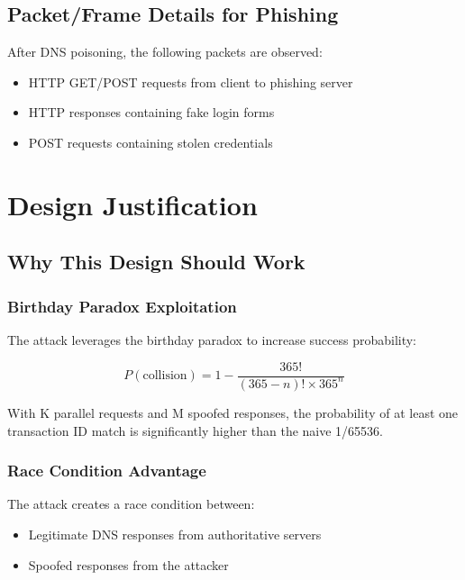 \documentclass[12pt,a4paper]{article}
\begin{document}
\subsection{Packet/Frame Details for Phishing}

After DNS poisoning, the following packets are observed:
\begin{itemize}
    \item HTTP GET/POST requests from client to phishing server
    \item HTTP responses containing fake login forms
    \item POST requests containing stolen credentials
\end{itemize}

\section{Design Justification}

\subsection{Why This Design Should Work}

\subsubsection{ Birthday Paradox Exploitation}

The attack leverages the birthday paradox \cite{feng-dns} to increase success probability:

\begin{equation}
P(\text{collision}) = 1 - \frac{365!}{(365-n)! \times 365^n}
\end{equation}

With K parallel requests and M spoofed responses, the probability of at least one transaction ID match is significantly higher than the naive 1/65536.

\subsubsection{ Race Condition Advantage}

The attack creates a race condition between:
\begin{itemize}
    \item Legitimate DNS responses from authoritative servers
    \item Spoofed responses from the attacker
\end{itemize}
\end{document}
